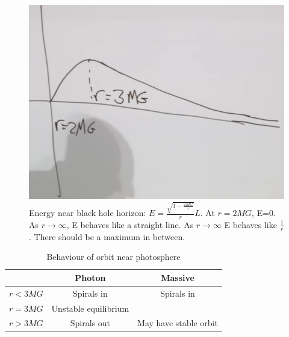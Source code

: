 \documentclass[]{article}
\begin{document}
{\begin{figure}[H]
	\begin{center}
		\caption[Energy near black hole horizon]{Energy near black hole horizon: $E=\frac{\sqrt{1-\frac{2MG}{r}}  }{r}L$. At $r=2MG$, E=0. As $r \rightarrow \infty$, E behaves like a straight line. As $r \rightarrow \infty$ E behaves like $\frac{1}{r}$. There should be a maximum in between. }\label{fig:gr-6-energy-r}
		\includegraphics{gr-6-energy-r}
	\end{center}
\end{figure}


\begin{table}
	\caption{Behaviour of orbit near photosphere}
	\begin{center}
		\begin{tabular}{|c|c|c|} \hline
			&Photon&Massive\\ \hline
			$r<3MG$&Spirals in&Spirals in\\ \hline
			$r=3MG$&Unstable equilibrium&\\ \hline
			$r>3MG$&Spirals out&May have stable orbit\\\hline
		\end{tabular}
	\end{center}
\end{table}

}
\end{document}
